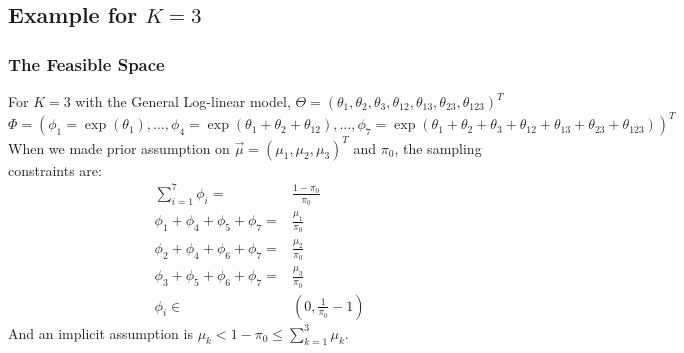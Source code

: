 \documentclass[11 pt, a4paper]{article}  %
\begin{document}
\newpage
\subsection{Example for $K=3$}
\subsubsection{The Feasible Space}
For $K=3$ with the General Log-linear model,
$\Theta = (\theta_1, \theta_2, \theta_3, \theta_{12}, \theta_{13}, \theta_{23}, \theta_{123})^T$\\
$\Phi = (\phi_1 = \exp{(\theta_1)}, \ldots, \phi_4 = \exp{(\theta_1 + \theta_2 + \theta_{12})}, \ldots, 
\phi_7 = \exp{(\theta_1 + \theta_2 + \theta_3 + \theta_{12} + \theta_{13} + \theta_{23} + \theta_{123})} )^T$
When we made prior assumption on $\vec{\mu} = (\mu_1, \mu_2, \mu_3)^T$ and $\pi_0$, the sampling constraints are:
\begin{align*}
\sum_{i=1}^7 \phi_i = & \frac{1-\pi_0}{\pi_0}\\
\phi_1 + \phi_4 + \phi_5 + \phi_7 = & \frac{\mu_1}{\pi_0}\\
\phi_2 + \phi_4 + \phi_6 + \phi_7 = & \frac{\mu_2}{\pi_0}\\
\phi_3 + \phi_5 + \phi_6 + \phi_7 = & \frac{\mu_3}{\pi_0}\\
\phi_i \in & (0, \frac{1}{\pi_0}-1)
\end{align*}
And an implicit assumption is $\mu_k < 1 - \pi_0 \leq \sum_{k=1}^3 \mu_k$.\\
\end{document}
